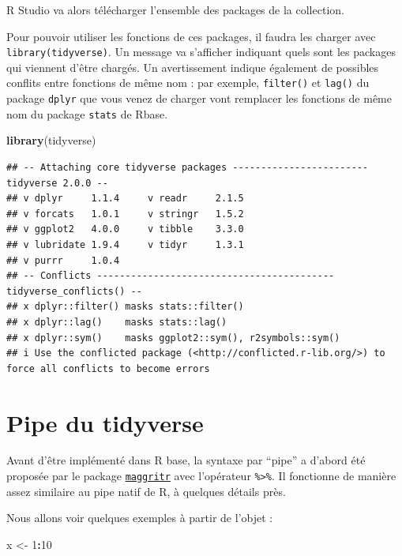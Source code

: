 \documentclass[
]{book}
\newenvironment{Shaded}{\begin{snugshade}}{\end{snugshade}}
\newcommand{\DecValTok}[1]{\textcolor[rgb]{0.00,0.00,0.81}{#1}}
\newcommand{\FunctionTok}[1]{\textcolor[rgb]{0.13,0.29,0.53}{\textbf{#1}}}
\newcommand{\NormalTok}[1]{#1}
\newcommand{\OtherTok}[1]{\textcolor[rgb]{0.56,0.35,0.01}{#1}}
\newcommand{\SpecialCharTok}[1]{\textcolor[rgb]{0.81,0.36,0.00}{\textbf{#1}}}
\begin{document}
R Studio va alors télécharger l'ensemble des packages de la collection.

Pour pouvoir utiliser les fonctions de ces packages, il faudra les charger avec \texttt{library(tidyverse)}. Un message va s'afficher indiquant quels sont les packages qui viennent d'être chargés. Un avertissement indique également de possibles conflits entre fonctions de même nom : par exemple, \texttt{filter()} et \texttt{lag()} du package \texttt{dplyr} que vous venez de charger vont remplacer les fonctions de même nom du package \texttt{stats} de Rbase.

\begin{Shaded}
\begin{Highlighting}[]
\FunctionTok{library}\NormalTok{(tidyverse)}
\end{Highlighting}
\end{Shaded}

\begin{verbatim}
## -- Attaching core tidyverse packages ------------------------ tidyverse 2.0.0 --
## v dplyr     1.1.4     v readr     2.1.5
## v forcats   1.0.1     v stringr   1.5.2
## v ggplot2   4.0.0     v tibble    3.3.0
## v lubridate 1.9.4     v tidyr     1.3.1
## v purrr     1.0.4     
## -- Conflicts ------------------------------------------ tidyverse_conflicts() --
## x dplyr::filter() masks stats::filter()
## x dplyr::lag()    masks stats::lag()
## x dplyr::sym()    masks ggplot2::sym(), r2symbols::sym()
## i Use the conflicted package (<http://conflicted.r-lib.org/>) to force all conflicts to become errors
\end{verbatim}

\section{Pipe du tidyverse}\label{pipe-du-tidyverse}

Avant d'être implémenté dans R base, la syntaxe par ``pipe'' a d'abord été proposée par le package \href{https://magrittr.tidyverse.org/}{\texttt{maggritr}} avec l'opérateur \texttt{\%\textgreater{}\%}. Il fonctionne de manière assez similaire au pipe natif de R, à quelques détails près.

Nous allons voir quelques exemples à partir de l'objet :

\begin{Shaded}
\begin{Highlighting}[]
\NormalTok{x }\OtherTok{\textless{}{-}} \DecValTok{1}\SpecialCharTok{:}\DecValTok{10}
\end{Highlighting}
\end{Shaded}
\end{document}
